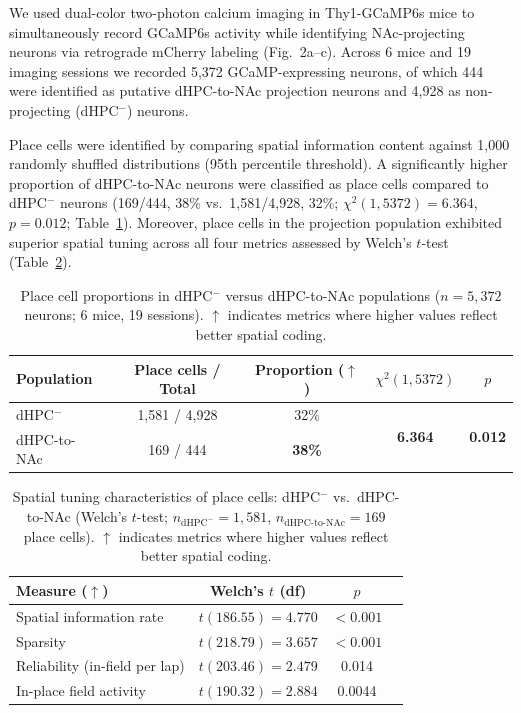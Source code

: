 \documentclass[11pt]{article}
\begin{document}
We used dual-color two-photon calcium imaging in Thy1-GCaMP6s mice to simultaneously record GCaMP6s activity while identifying NAc-projecting neurons via retrograde mCherry labeling (Fig.~2a--c). Across 6 mice and 19 imaging sessions we recorded 5,372 GCaMP-expressing neurons, of which 444 were identified as putative dHPC-to-NAc projection neurons and 4,928 as non-projecting (dHPC$^{-}$) neurons.

Place cells were identified by comparing spatial information content against 1,000 randomly shuffled distributions (95th percentile threshold). A significantly higher proportion of dHPC-to-NAc neurons were classified as place cells compared to dHPC$^{-}$ neurons (169/444, 38\% vs.\ 1,581/4,928, 32\%; $\chi^{2}(1, 5372)=6.364$, $p=0.012$; Table~\ref{tab:placecells}). Moreover, place cells in the projection population exhibited superior spatial tuning across all four metrics assessed by Welch's $t$-test (Table~\ref{tab:spatialtuning}).

\begin{table}[H]
\centering
\caption{Place cell proportions in dHPC$^{-}$ versus dHPC-to-NAc populations ($n=5{,}372$ neurons; 6 mice, 19 sessions). $\uparrow$ indicates metrics where higher values reflect better spatial coding.}
\label{tab:placecells}
\begin{tabular}{lcccc}
\toprule
Population & Place cells / Total & Proportion ($\uparrow$) & $\chi^{2}(1, 5372)$ & $p$ \\
\midrule
dHPC$^{-}$ & 1,581 / 4,928 & 32\% & \multirow{2}{*}{\textbf{6.364}} & \multirow{2}{*}{\textbf{0.012}} \\
dHPC-to-NAc & 169 / 444 & \textbf{38\%} & & \\
\bottomrule
\end{tabular}
\end{table}

\begin{table}[H]
\centering
\caption{Spatial tuning characteristics of place cells: dHPC$^{-}$ vs.\ dHPC-to-NAc (Welch's $t$-test; $n_{\text{dHPC}^{-}}=1{,}581$, $n_{\text{dHPC-to-NAc}}=169$ place cells). $\uparrow$ indicates metrics where higher values reflect better spatial coding.}
\label{tab:spatialtuning}
\begin{tabular}{lccc}
\toprule
Measure ($\uparrow$) & Welch's $t$ (df) & $p$ \\
\midrule
Spatial information rate & $t(186.55)=\mathbf{4.770}$ & $<0.001$ \\
Sparsity & $t(218.79)=\mathbf{3.657}$ & $<0.001$ \\
Reliability (in-field per lap) & $t(203.46)=\mathbf{2.479}$ & 0.014 \\
In-place field activity & $t(190.32)=\mathbf{2.884}$ & 0.0044 \\
\bottomrule
\end{tabular}
\end{table}
\end{document}

